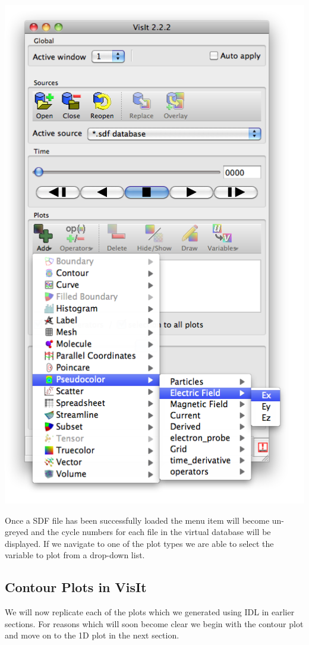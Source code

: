   \begin{center}
    \includegraphics[height=0.7\textheight]{images/visit_select_var}
  \end{center}
  Once a SDF file has been successfully loaded the  menu item
  will become un-greyed and the cycle numbers for each file in the virtual
  database will be displayed. If we navigate to one of the plot types we
  are able to select the variable to plot from a drop-down list.

\subsection{Contour Plots in VisIt}
  We will now replicate each of the plots which we generated using IDL
  in earlier sections. For reasons which will soon become clear we begin
  with the contour plot and move on to the 1D plot in the next section.

